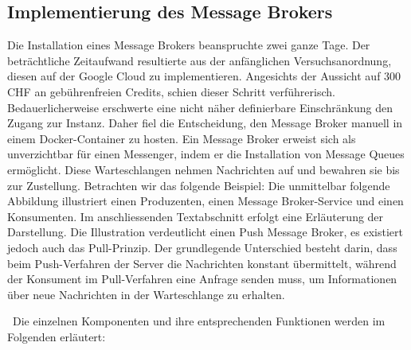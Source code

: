 \subsection{Implementierung des Message Brokers}
Die Installation eines Message Brokers beanspruchte zwei ganze Tage. Der beträchtliche Zeitaufwand resultierte aus der anfänglichen Versuchsanordnung, diesen auf der Google Cloud zu implementieren. Angesichts der Aussicht auf 300 CHF an gebührenfreien Credits, schien dieser Schritt verführerisch. Bedauerlicherweise erschwerte eine nicht näher definierbare Einschränkung den Zugang zur Instanz. Daher fiel die Entscheidung, den Message Broker manuell in einem Docker-Container zu hosten. Ein Message Broker erweist sich als unverzichtbar für einen Messenger, indem er die Installation von Message Queues ermöglicht. Diese Warteschlangen nehmen Nachrichten auf und bewahren sie bis zur Zustellung. Betrachten wir das folgende Beispiel: Die unmittelbar folgende Abbildung illustriert einen Produzenten, einen Message Broker-Service und einen Konsumenten. Im anschliessenden Textabschnitt erfolgt eine Erläuterung der Darstellung. Die Illustration verdeutlicht einen Push Message Broker, es existiert jedoch auch das Pull-Prinzip. Der grundlegende Unterschied besteht darin, dass beim Push-Verfahren der Server die Nachrichten konstant übermittelt, während der Konsument im Pull-Verfahren eine Anfrage senden muss, um Informationen über neue Nachrichten in der Warteschlange zu erhalten.\\
\
Die einzelnen Komponenten und ihre entsprechenden Funktionen werden im Folgenden erläutert:
